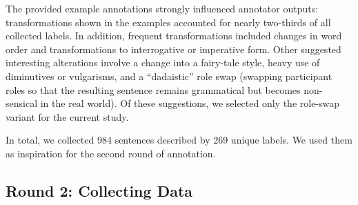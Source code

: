 The provided example annotations strongly influenced annotator outputs: transformations shown in the examples accounted for nearly two-thirds of all collected labels. In addition, frequent transformations included changes in word order and transformations to interrogative or imperative form. Other suggested interesting alterations involve a change into a fairy-tale style, heavy use of diminutives or vulgarisms, and a ``dadaistic'' role swap (swapping participant roles so that the resulting sentence remains grammatical but becomes non-sensical in the real world). Of these suggestions, we selected only the role-swap variant for the current study. %

In total, we collected 984 sentences described by 269 unique labels. We used them as  inspiration for the second round of annotation.

\subsection{Round 2: Collecting Data}



